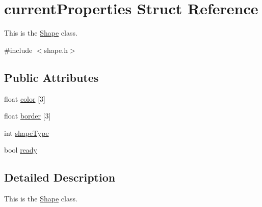 \hypertarget{structcurrentProperties}{\section{current\-Properties Struct Reference}
\label{structcurrentProperties}
}


This is the \hyperlink{classShape}{Shape} class.  




{\ttfamily \#include $<$shape.\-h$>$}

\subsection*{Public Attributes}
\begin{DoxyCompactItemize}
\item 
float \hyperlink{structcurrentProperties_a444727aa40fea7fd0020434b7ebc9245}{color} \mbox{[}3\mbox{]}
\item 
float \hyperlink{structcurrentProperties_aa67742be2101d7049d5503f7d5a2e3a5}{border} \mbox{[}3\mbox{]}
\item 
int \hyperlink{structcurrentProperties_a3fb7d1d3f56132c1530f1a2a307a3172}{shape\-Type}
\item 
bool \hyperlink{structcurrentProperties_a73bc7474c39c0b1580577ad635074c67}{ready}
\end{DoxyCompactItemize}


\subsection{Detailed Description}
This is the \hyperlink{classShape}{Shape} class. 


